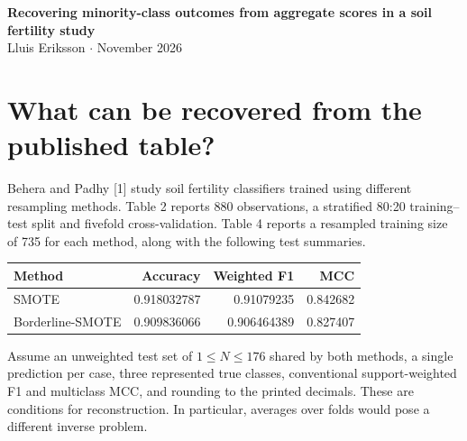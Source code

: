 \documentclass[11pt]{article}
\begin{document}
\begin{center}{\LARGE\bfseries Recovering minority-class outcomes from aggregate scores in a soil fertility study}\\[8pt]
Lluis Eriksson \quad $\cdot$  November 2026
\end{center}
\begin{abstract}
Can two aggregate classifier scores reveal how a rare class fared? In a comparison of soil fertility resampling methods, the reported accuracy, weighted F1 and multiclass Matthews correlation coefficient identify both three-class confusion matrices up to relabeling, under the interpretation that the scores describe a common unweighted test set of at most 176 observations. The only compatible test size is 122. Both methods miss all three members of the least frequent class. The one additional correct prediction under SMOTE is a net gain in the middle-sized class. This reconstruction also identifies a discrepancy with a literal 20 percent holdout of the reported 880 observations. We present the integer certificates and the exact limits of what the reconstructed margins imply about paired comparisons.
\end{abstract}

\section*{What can be recovered from the published table?}
Behera and Padhy [1] study soil fertility classifiers trained using different resampling methods. Table 2 reports 880 observations, a stratified 80:20 training--test split and fivefold cross-validation. Table 4 reports a resampled training size of 735 for each method, along with the following test summaries.
\begin{center}\begin{tabular}{lrrr}\toprule
Method & Accuracy & Weighted F1 & MCC\\\midrule
SMOTE & 0.918032787 & 0.91079235 & 0.842682\\
Borderline-SMOTE & 0.909836066 & 0.906464389 & 0.827407\\\bottomrule
\end{tabular}\end{center}

Assume an unweighted test set of $1\le N\le176$ shared by both methods, a single prediction per case, three represented true classes, conventional support-weighted F1 and multiclass MCC, and rounding to the printed decimals. These are conditions for reconstruction. In particular, averages over folds would pose a different inverse problem.
\end{document}

